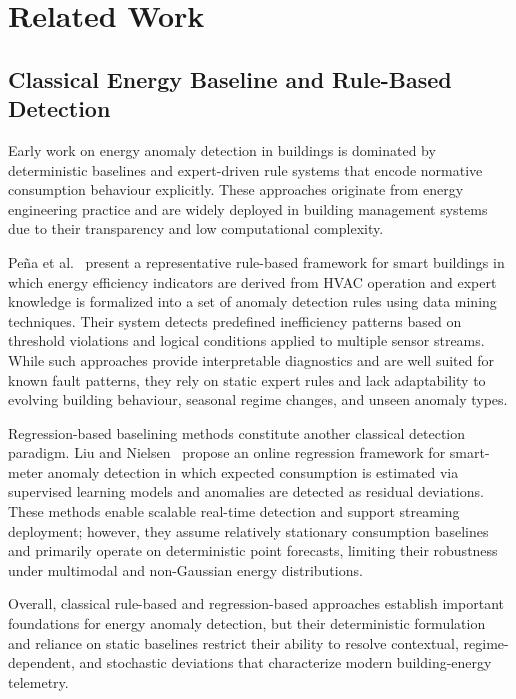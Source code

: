 \chapter{Related Work}
\label{chap:state-of-the-art}
\section{Classical Energy Baseline and Rule-Based Detection}
\label{sec:classical-energy-anomaly-detection}
Early work on energy anomaly detection in buildings is dominated by deterministic baselines and expert-driven rule systems that encode normative consumption behaviour explicitly. These approaches originate from energy engineering practice and are widely deployed in building management systems due to their transparency and low computational complexity.

Pe\~na et al.~\cite{pena2016rule} present a representative rule-based framework for smart buildings in which energy efficiency indicators are derived from \ac{HVAC} operation and expert knowledge is formalized into a set of anomaly detection rules using data mining techniques. Their system detects predefined inefficiency patterns based on threshold violations and logical conditions applied to multiple sensor streams. While such approaches provide interpretable diagnostics and are well suited for known fault patterns, they rely on static expert rules and lack adaptability to evolving building behaviour, seasonal regime changes, and unseen anomaly types.

Regression-based baselining methods constitute another classical detection paradigm. Liu and Nielsen~\cite{liu2016regression} propose an online regression framework for smart-meter anomaly detection in which expected consumption is estimated via supervised learning models and anomalies are detected as residual deviations. These methods enable scalable real-time detection and support streaming deployment; however, they assume relatively stationary consumption baselines and primarily operate on deterministic point forecasts, limiting their robustness under multimodal and non-Gaussian energy distributions.

Overall, classical rule-based and regression-based approaches establish important foundations for energy anomaly detection, but their deterministic formulation and reliance on static baselines restrict their ability to resolve contextual, regime-dependent, and stochastic deviations that characterize modern building-energy telemetry.

